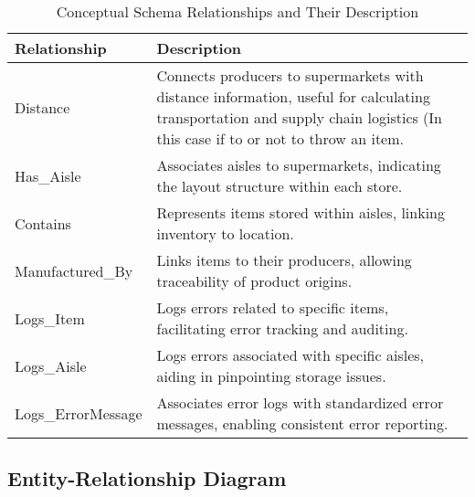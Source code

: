 \documentclass[a4paper,12pt]{article}
\begin{document}
\begin{table}[H]
\centering
\begin{tabularx}{\textwidth}{@{} l >{\RaggedRight\arraybackslash}X @{}}
\toprule
\textbf{Relationship} & \textbf{Description} \\ \midrule
Distance & Connects producers to supermarkets with distance information, useful for calculating transportation and supply chain logistics (In this case if to or not to throw an item. \\ 
Has\_Aisle & Associates aisles to supermarkets, indicating the layout structure within each store. \\ 
Contains & Represents items stored within aisles, linking inventory to location. \\ 
Manufactured\_By & Links items to their producers, allowing traceability of product origins. \\ 
Logs\_Item & Logs errors related to specific items, facilitating error tracking and auditing. \\ 
Logs\_Aisle & Logs errors associated with specific aisles, aiding in pinpointing storage issues. \\ 
Logs\_ErrorMessage & Associates error logs with standardized error messages, enabling consistent error reporting. \\ 
\bottomrule
\end{tabularx}
\caption{Conceptual Schema Relationships and Their Description}
\label{tab:relationship-descriptions}
\end{table}

\subsection{Entity-Relationship Diagram}
\newpage
\end{document}
